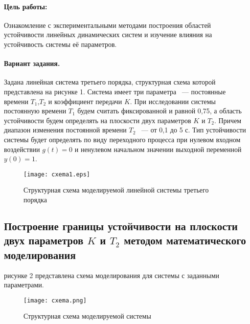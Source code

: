 \documentclass[12pt,a4paper]{article}
\begin{document}


\paragraph{Цель работы:}Ознакомление с экспериментальными методами построения областей устойчивости линейных динамических систем и изучение влияния на устойчивость системы её параметров.%
\paragraph{Вариант задания.} Задана линейная система третьего порядка, структурная схема которой представлена на рисунке 1. Система имеет три параметра ~--- постоянные времени $T_1$,$T_2$ и коэффициент передачи $K$. При исследовании системы постоянную времени $T_1$ будем считать фиксированной и равной 0,75, а область устойчивости будем определять на плоскости двух параметров $K$ и $T_2$. Причем диапазон изменения постоянной времени $T_2$ ~--- от 0,1 до 5 с. Тип устойчивости системы будет определять по виду переходного процесса при нулевом входном воздействии $g(t)=0$ и ненулевом начальном значении выходной переменной $y(0)=1$.
\begin{figure}[h!]
	\centering
	\texttt{[image: cxema1.eps]}
	\caption{Структурная схема моделируемой линейной системы третьего порядка}
\end{figure} 

\newpage
\begin{center}
    \section{Построение границы устойчивости на плоскости двух параметров $K$ и $T_2$ методом математического моделирования}
\end{center}
 рисунке 2 представлена схема моделирования для системы с заданными параметрами.
\begin{figure}[h!]
	\centering
	\texttt{[image: cxema.png]}
	\caption{Структурная схема моделируемой системы}
\end{figure}
 
\end{document}
